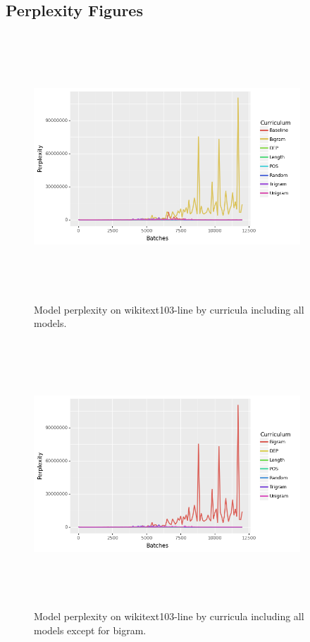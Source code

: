 \documentclass [11pt, proquest] {uwthesis}[2020/12/20]
\begin{document}
\subsection{Perplexity Figures}
\begin{figure}[h]
\centering
\label{fig:wikitext-103-sentence}
\includegraphics[width=10cm, height=10cm]{Thesis/images/wikitext-103lineall.png}
\caption{Model perplexity on wikitext103-line by curricula including all models.}
\end{figure}
\begin{figure}[h]
\centering
\label{fig:wikitext-103-sentence}
\includegraphics[width=10cm, height=10cm]{Thesis/images/wikitext-103lineminusbigram.png}
\caption{Model perplexity on wikitext103-line by curricula including all models except for bigram.}
\end{figure}
\end{document}
